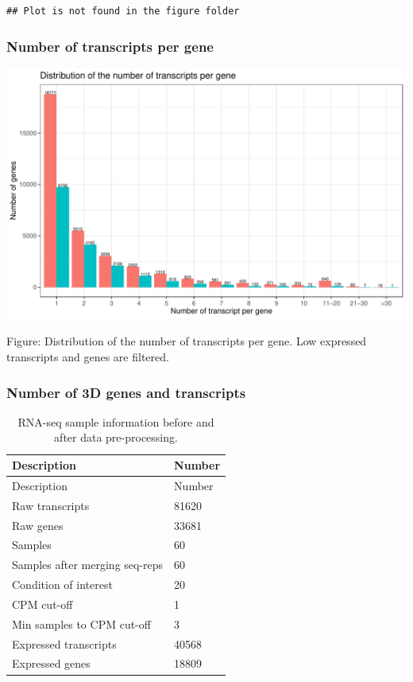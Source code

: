 \documentclass[]{article}
\begin{document}
\begin{verbatim}
## Plot is not found in the figure folder
\end{verbatim}

\subsubsection{Number of transcripts per
gene}\label{number-of-transcripts-per-gene}

\includegraphics[width=16.67in]{X2025.01.13.16.34.12.j145/figure/Distribution of the number of transcripts per gene}

Figure: Distribution of the number of transcripts per gene. Low
expressed transcripts and genes are filtered.

\subsubsection{Number of 3D genes and
transcripts}\label{number-of-3d-genes-and-transcripts}

\begin{longtable}[]{@{}ll@{}}
\caption{RNA-seq sample information before and after data
pre-processing.}\tabularnewline
\toprule
Description & Number\tabularnewline
\midrule
\endfirsthead
\toprule
Description & Number\tabularnewline
\midrule
\endhead
Raw transcripts & 81620\tabularnewline
Raw genes & 33681\tabularnewline
Samples & 60\tabularnewline
Samples after merging seq-reps & 60\tabularnewline
Condition of interest & 20\tabularnewline
CPM cut-off & 1\tabularnewline
Min samples to CPM cut-off & 3\tabularnewline
Expressed transcripts & 40568\tabularnewline
Expressed genes & 18809\tabularnewline
\bottomrule
\end{longtable}
\end{document}
